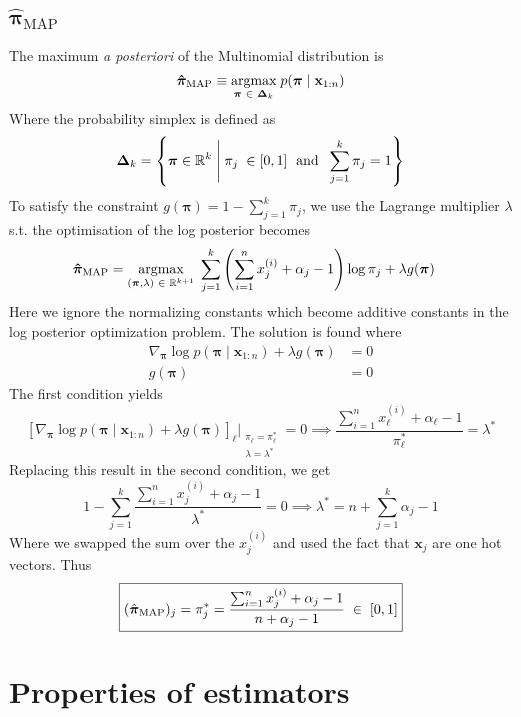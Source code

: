 \documentclass{article}
\newcommand{\s}{\hspace{0.1cm}}
\numberwithin{equation}{section}
\begin{document}
 \subsection{$\hat{\bm{\pi}}_{\text{MAP}}  $}
 The maximum \textit{a posteriori} of the Multinomial distribution is
 \[
         \bm{ \hat{\pi}}_{\text{MAP}} \equiv \underset{\bm{ \pi}  \s \in \s \bm{ \Delta}_k }{\text{argmax}}
         \s
         p(\bm{ \pi} \mid \mathbf{x}_{1:n}) 
 \]
 Where the probability simplex is defined as 
 \[
         \bm{\Delta }_k = \left\{ \bm{ \pi}  \in \mathbb{R}^k \Biggm| \pi_j \s\in [0,1]\s 
                 \text{ and }\s \sum_{j = 1}^k \pi_j = 1 
         \right\}
 \]
 To satisfy the constraint $g(\bm{ \pi})= 1 - \sum_{j=1}^k \pi_j $, we use the Lagrange 
 multiplier $\lambda$ s.t. the optimisation of the log posterior becomes
 \begin{align*}
         \bm{ \hat{\pi}}_{\text{MAP}} &= 
         \underset{(\bm{ \pi},\lambda)  \s \in \s \mathbb{R}^{k+1} }{\text{argmax}}
         \s
         \sum_{j = 1}^k \left(\sum_{i = 1}^n x_j^{(i)} + \alpha_j - 1\right) \log\pi_j+ \lambda g(\bm{ \pi}) 
 \end{align*} 
 Here we ignore the normalizing constants which become additive constants in the log 
 posterior optimization problem.
 The solution is found where 
 \begin{align*}
         \nabla_{\bm{ \pi}}  \log p(\bm{ \pi} \mid \mathbf{x}_{1:n} ) + \lambda g(\bm{ \pi}) &= 0 \\
         g(\bm{ \pi}) &= 0
 \end{align*} 
 The first condition yields
 \[
         \left[ \nabla_{\bm{ \pi}} 
         \log p(\bm{ \pi} \mid \mathbf{x}_{1:n} ) 
         + \lambda g(\bm{ \pi}) 
 \right]_\ell
 \bigg|_{\substack{\pi_\ell = \pi_\ell^*\\ \lambda = \lambda^*}}   = 0 
         \implies \frac{\sum_{i = 1}^n x_\ell^{(i)} + \alpha_\ell - 1}{\pi^*_\ell}
          =\lambda^*
 \]
 Replacing this result in the second condition, we get
 \[
         1 - \sum_{j = 1}^k \frac{\sum_{i = 1}^n x_j^{(i)} + \alpha_j - 1}{\lambda^*} = 0
         \implies 
         \lambda^* = n + \sum_{j = 1}^k \alpha_j - 1
 \]
 Where we swapped the sum over the $x_j^{(i)}$ and used the fact that  $\mathbf{x}_j$ are 
 one hot vectors. Thus
 \[
         \boxed{(\hat{\bm{ \pi} }_{\text{MAP}} )_j = \pi^*_j = 
         \frac{\sum_{i = 1}^n x_j^{(i)} + \alpha_j - 1}{n + \alpha_j -  1}\s \in \s [0,1] }
 \]


 \section{Properties of estimators}
\end{document}
